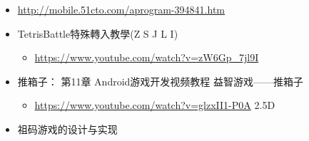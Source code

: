 \documentclass[9pt,b5paper]{article}
\begin{document}
\begin{itemize}
\item \url{http://mobile.51cto.com/aprogram-394841.htm}
\item TetrisBattle特殊轉入教學(Z S J L I)
\begin{itemize}
\item \url{https://www.youtube.com/watch?v=zW6Gp_7jl9I}
\end{itemize}
\item 推箱子： 第11章 Android游戏开发视频教程 益智游戏——推箱子
\begin{itemize}
\item \url{https://www.youtube.com/watch?v=glzxII1-P0A} 2.5D
\end{itemize}
\item 祖码游戏的设计与实现
\end{itemize}
\end{document}
